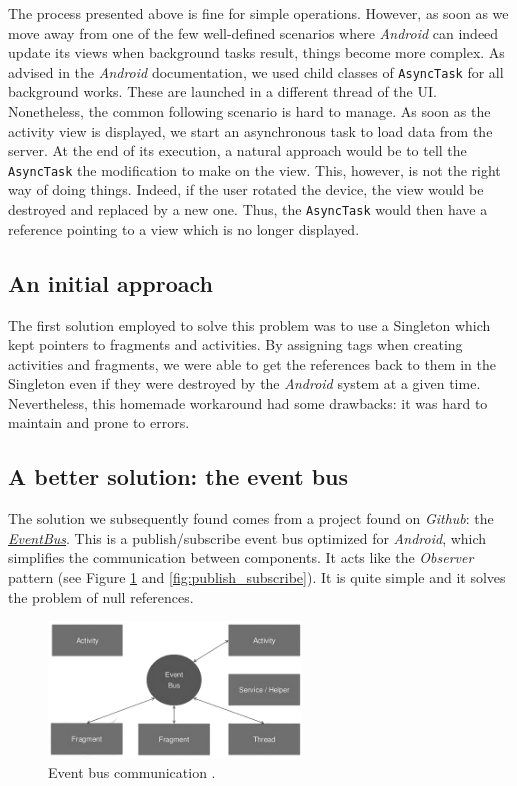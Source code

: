 \documentclass[a4paper, oneside, 11pt]{book}
\begin{document}
The process presented above is fine for simple operations. However, as soon as we move away from one of the few well-defined scenarios where \textit{Android} can indeed update its views when background tasks result, things become more complex. As advised in the \textit{Android} documentation, we used child classes of \texttt{AsyncTask} for all background works. These are launched in a different thread of the UI. \\

Nonetheless, the common following scenario is hard to manage. As soon as the activity view is displayed, we start an asynchronous task to load data from the server. At the end of its execution, a natural approach would be to tell the \texttt{AsyncTask} the modification to make on the view. This, however, is not the right way of doing things. Indeed, if the user rotated the device, the view would be destroyed and replaced by a new one. Thus, the \texttt{AsyncTask} would then have a reference pointing to a view which is no longer displayed.

\subsection{An initial approach}
The first solution employed to solve this problem was to use a Singleton which kept pointers to fragments and activities. By assigning tags when creating activities and fragments, we were able to get the references back to them in the Singleton even if they were destroyed by the \textit{Android} system at a given time. Nevertheless, this homemade workaround had some drawbacks: it was hard to maintain and prone to errors.

\subsection{A better solution: the event bus}
The solution we subsequently found comes from a project found on \textit{Github}: the \href{https://github.com/greenrobot/EventBus}{\textit{EventBus}}. This is a publish/subscribe event bus optimized for \textit{Android}, which simplifies the communication between components. It acts like the \emph{Observer} pattern (see Figure \ref{fig:eventbus} and \ref{fig:publish_subscribe}). It is quite simple and it solves the problem of null references.

\begin{figure}[htbp]
	\centerline{\includegraphics[width=0.6\textwidth]{eventbus.png}}
	\caption{Event bus communication \cite{Eventbusslide:online}.}
	\label{fig:eventbus}
\end{figure}
\end{document}
